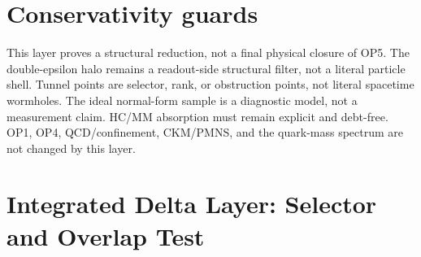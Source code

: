 \section{Conservativity guards}

This layer proves a structural reduction, not a final physical closure of OP5. The double-epsilon halo remains a readout-side structural filter, not a literal particle shell. Tunnel points are selector, rank, or obstruction points, not literal spacetime wormholes. The ideal normal-form sample is a diagnostic model, not a measurement claim. HC/MM absorption must remain explicit and debt-free. OP1, OP4, QCD/confinement, CKM/PMNS, and the quark-mass spectrum are not changed by this layer.



\clearpage
\section*{Integrated Delta Layer: Selector and Overlap Test}
\providecommand{\HC}{}
\renewcommand{\HC}{\mathrm{HC}}
\providecommand{\MM}{}
\renewcommand{\MM}{\mathrm{MM}}
\providecommand{\OP}{}
\renewcommand{\OP}{\mathrm{OP}}
\providecommand{\adm}{}
\renewcommand{\adm}{\mathrm{adm}}
\providecommand{\tun}{}
\renewcommand{\tun}{\mathrm{tun}}
\providecommand{\unr}{}
\renewcommand{\unr}{\mathrm{unr}}
\providecommand{\rk}{}
\renewcommand{\rk}{\mathrm{rk}}
\providecommand{\ov}{}
\renewcommand{\ov}{\mathrm{ov}}
\providecommand{\HaloOp}{}
\renewcommand{\HaloOp}{\mathsf{Halo}}
\providecommand{\ExitOp}{}
\renewcommand{\ExitOp}{\mathsf{Exit}}
\providecommand{\Atlas}{}
\renewcommand{\Atlas}{\mathfrak A}
\providecommand{\epsr}{}
\renewcommand{\epsr}{\varepsilon_r}
\providecommand{\epsh}{}
\renewcommand{\epsh}{\varepsilon_h}
\providecommand{\Xop}{}
\renewcommand{\Xop}{\mathcal X_{\OP 5}^{\adm}}
\providecommand{\rhoR}{}
\renewcommand{\rhoR}{\rho_{r}^{\gamma}}
\providecommand{\rhoH}{}
\renewcommand{\rhoH}{\rho_{h}^{\gamma}}
\providecommand{\Eexit}{}
\renewcommand{\Eexit}{\mathcal E_{\ExitOp}^{\gamma,K}}
\providecommand{\Jexit}{}
\renewcommand{\Jexit}{J_{\ExitOp}^{\gamma,K}}
\providecommand{\rHC}{}
\renewcommand{\rHC}{r_{\HC}^{(1)}}
\providecommand{\Crk}{}
\renewcommand{\Crk}{\mathcal C_{\rk}^{\mathrm{loc}}}
\providecommand{\Cchi}{}
\renewcommand{\Cchi}{\mathcal C_{\chi}^{\mathrm{loc}}}
\providecommand{\Wreg}{}
\renewcommand{\Wreg}{W_j^{\mathrm{loc}}}
\providecommand{\Lunr}{}
\renewcommand{\Lunr}{L_{\unr}}
\providecommand{\Bhcmm}{}
\renewcommand{\Bhcmm}{B_{\HC/\MM}}
\providecommand{\marg}{}
\renewcommand{\marg}{\mathfrak m}
\providecommand{\thetaMax}{}
\renewcommand{\thetaMax}{\theta_{\max}^{\mathrm{loc}}}
\providecommand{\Ncollar}{}
\renewcommand{\Ncollar}{\mathsf N_{\HC}^{\gamma,K}}



